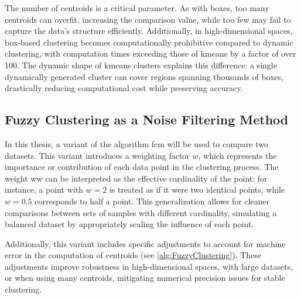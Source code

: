 \begin{toReview}
\begin{exempli_gratia}
	\noindent The number of centroids is a critical parameter. As with boxes, too many centroids can overfit, increasing the comparison value, while too few may fail to capture the data's structure efficiently. Additionally, in high-dimensional spaces, box-based clustering becomes computationally prohibitive compared to dynamic clustering, with computation times exceeding those of \gls{kmeans} by a factor of over 100. The dynamic shape of \gls{kmeans} clusters explains this difference: a single dynamically generated cluster can cover regions spanning thousands of boxes, drastically reducing computational cost while preserving accuracy.
\end{exempli_gratia}
\end{toReview}

\subsection{Fuzzy Clustering as a Noise Filtering Method}
\begin{modified}
In this thesis, a variant of the algorithm \gls{fcm} will be used to compare two datasets. This variant introduces a weighting factor $w$, which represents the importance or contribution of each data point in the clustering process. The weight ww can be interpreted as the effective cardinality of the point: for instance, a point with $w=2$ is treated as if it were two identical points, while $w=0.5$ corresponds to half a point. This generalization allows for cleaner comparisons between sets of samples with different cardinality, simulating a balanced dataset by appropriately scaling the influence of each point.

\noindent Additionally, this variant includes specific adjustments to account for machine error in the computation of centroids (see \cref{alg:FuzzyClustering}). These adjustments improve robustness in high-dimensional spaces, with large datasets, or when using many centroids, mitigating numerical precision issues for stable clustering.
\end{modified}
